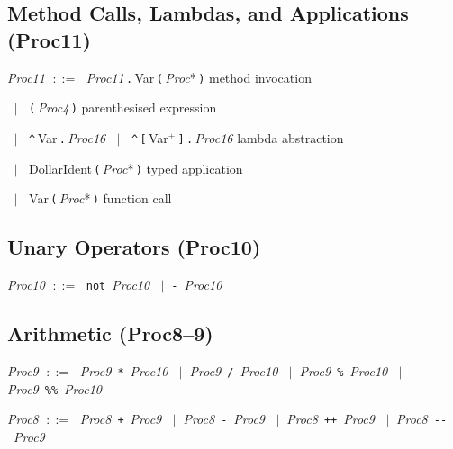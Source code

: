 \documentclass[11pt,a4paper]{article}
\newcommand{\kw}[1]{\texttt{\textcolor{kw}{#1}}}       %
\newcommand{\sym}[1]{\texttt{#1}}                       %
\newcommand{\nt}[1]{\textit{\textcolor{nt}{#1}}}        %
\newcommand{\tok}[1]{\textsf{#1}}                       %
\newcommand{\OR}{\ensuremath{\;\mid\;}}                  %
\newcommand{\bnfdef}{\ensuremath{\;::=\;}}               %
\newenvironment{grammar}{%
  \par\smallskip\begin{list}{}{%
    \setlength{\leftmargin}{1.5em}%
    \setlength{\itemsep}{2pt}%
    \setlength{\parsep}{0pt}}%
}{\end{list}\smallskip}
\begin{document}
\subsection{Method Calls, Lambdas, and Applications (Proc11)}

\begin{grammar}
\item \nt{Proc11} \bnfdef
    \nt{Proc11}\,\sym{.}\,\tok{Var}\,\sym{(}\,\nt{Proc}*\,\sym{)}
    \hfill\textcolor{cmt}{method invocation}
\item \phantom{\nt{Proc11}} \OR
    \sym{(}\,\nt{Proc4}\,\sym{)}
    \hfill\textcolor{cmt}{parenthesised expression}
\item \phantom{\nt{Proc11}} \OR
    \sym{\^{}}\,\tok{Var}\,\sym{.}\,\nt{Proc16}
    \OR
    \sym{\^{}}\,\sym{[}\,\tok{Var}$^+$\,\sym{]}\,\sym{.}\,\nt{Proc16}
    \hfill\textcolor{cmt}{lambda abstraction}
\item \phantom{\nt{Proc11}} \OR
    \tok{DollarIdent}\,\sym{(}\,\nt{Proc}*\,\sym{)}
    \hfill\textcolor{cmt}{typed application}
\item \phantom{\nt{Proc11}} \OR
    \tok{Var}\,\sym{(}\,\nt{Proc}*\,\sym{)}
    \hfill\textcolor{cmt}{function call}
\end{grammar}

\subsection{Unary Operators (Proc10)}

\begin{grammar}
\item \nt{Proc10} \bnfdef
    \kw{not}~\nt{Proc10}
    \OR \sym{-}~\nt{Proc10}
\end{grammar}

\subsection{Arithmetic (Proc8--9)}

\begin{grammar}
\item \nt{Proc9} \bnfdef
    \nt{Proc9}~\sym{*}~\nt{Proc10}
    \OR \nt{Proc9}~\sym{/}~\nt{Proc10}
    \OR \nt{Proc9}~\sym{\%}~\nt{Proc10}
    \OR \nt{Proc9}~\sym{\%\%}~\nt{Proc10}
\item \nt{Proc8} \bnfdef
    \nt{Proc8}~\sym{+}~\nt{Proc9}
    \OR \nt{Proc8}~\sym{-}~\nt{Proc9}
    \OR \nt{Proc8}~\sym{++}~\nt{Proc9}
    \OR \nt{Proc8}~\sym{-{}-}~\nt{Proc9}
\end{grammar}
\end{document}
